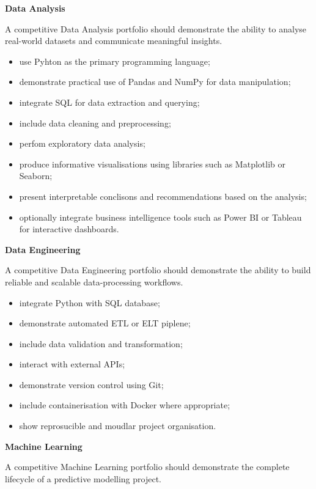 \medskip

\textbf{Data Analysis}

A competitive Data Analysis portfolio should demonstrate the ability to analyse real-world datasets and communicate meaningful insights.

\begin{itemize}
    \item use Pyhton as the primary programming language;
    \item demonstrate practical use of Pandas and NumPy for data manipulation;
    \item integrate SQL for data extraction and querying;
    \item include data cleaning and preprocessing;
    \item perfom exploratory data analysis;
    \item produce informative visualisations using libraries such as Matplotlib or Seaborn;
    \item present interpretable conclisons and recommendations based on the analysis;
    \item optionally integrate business intelligence tools such as Power BI or Tableau for interactive dashboards.
\end{itemize}

\medskip

\textbf{Data Engineering}

A competitive Data Engineering portfolio should demonstrate the ability to build reliable and scalable data-processing workflows.

\begin{itemize}
    \item integrate Python with SQL database;
    \item demonstrate automated ETL or ELT piplene;
    \item include data validation and transformation;
    \item interact with external APIs;
    \item demonstrate version control using Git;
    \item include containerisation with Docker where appropriate;
    \item show reprosucible and moudlar project organisation.
\end{itemize}

\medskip
\textbf{Machine Learning}

A competitive Machine Learning portfolio should demonstrate the complete lifecycle of a predictive modelling project.

